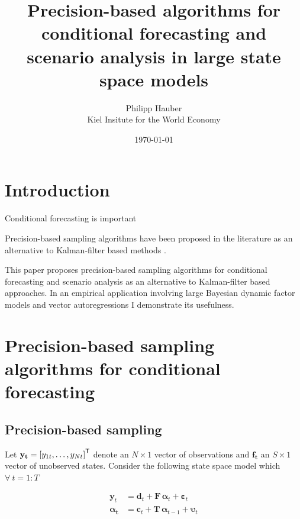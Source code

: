 \documentclass[notitlepage,a4paper,12pt]{article}
\newcommand{\transpose}[1]{{#1}^{\sf{T}}}
\begin{document}
\title{Precision-based algorithms for conditional forecasting and scenario analysis in large state space models}

\author{
  Philipp Hauber\\
  Kiel Insitute for the World Economy
}
\date{\today}

\maketitle

\section{Introduction}

Conditional forecasting is important \citep{bgl_2015ijf}

Precision-based sampling algorithms have been proposed in the literature as an alternative to Kalman-filter based methods \citep{chanjeliazkov_2009}.

This paper proposes precision-based sampling algorithms for conditional forecasting and scenario analysis as an alternative to Kalman-filter based approaches. In an empirical application involving large Bayesian dynamic factor models and vector autoregressions I demonstrate its usefulness. 

\section{Precision-based sampling algorithms for conditional forecasting}\label{sec:precsampler}

\subsection{Precision-based sampling}\label{subsec:precsampler}

Let $\mathbf{y_t} = \transpose{[y_{1t}, \dots, y_{Nt}]}$ denote an $N \times 1$ vector of observations and $\mathbf{f_t}$ an $S \times 1$ vector of unobserved states. Consider the following state space model which $\forall \: t = 1:T$ 

\begin{subequations}
    \label{eqn:statespacesys}
    \begin{align}
        \mathbf{y}_t &= \mathbf{d}_t + \mathbf{F} \,\boldsymbol{\alpha}_t + \boldsymbol{\varepsilon}_t \label{eqn:statespacesys_meas}\\
        \boldsymbol{\alpha_t} &= \mathbf{c}_t + \mathbf{T} \, \boldsymbol{\alpha}_{t-1} + \boldsymbol{\upsilon}_t \label{eqn:statespacesys_trans}
    \end{align}
\end{subequations}
\end{document}
